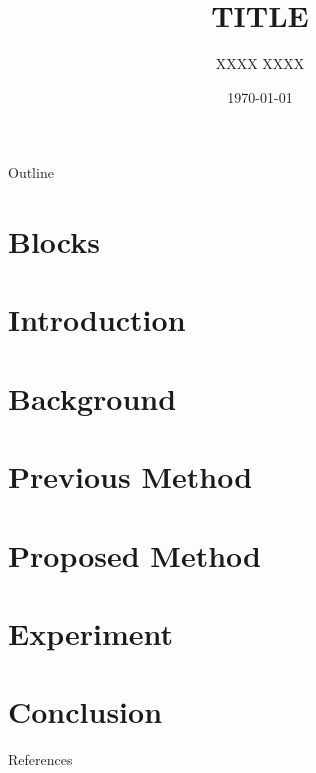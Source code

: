 \documentclass[aspectratio=169, 10.5pt]{beamer}
\title{TITLE}
\author{XXXX XXXX}
\date{\today}
\institute{INSTITUTE}
\begin{document}
\maketitle

\begin{frame}{Outline}
  \tableofcontents
\end{frame}

\section{Blocks}


\section{Introduction}


\section{Background}


\section{Previous Method}


\section{Proposed Method}


\section{Experiment}


\section{Conclusion}


\begin{frame}[allowframebreaks]{References}
  \printbibliography
\end{frame}


\end{document}
